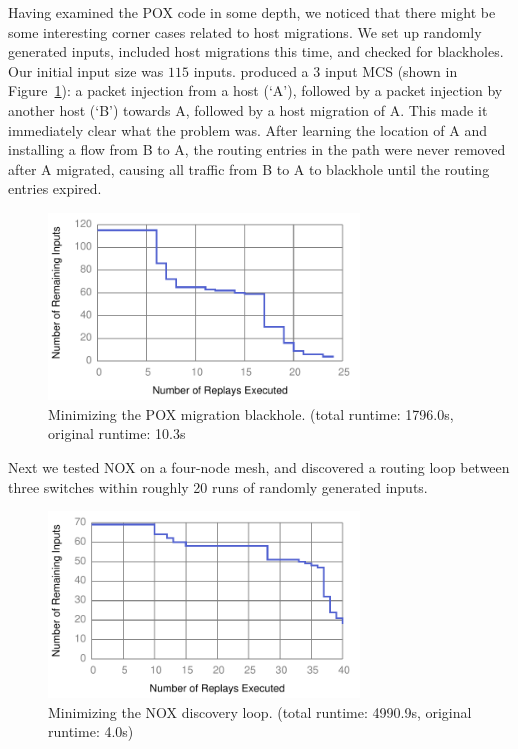 Having
examined the POX code in some depth, we noticed that there might be
some interesting corner cases related to host migrations.
We set up randomly generated inputs, included host
migrations this time, and checked for blackholes. Our initial input size was
$115$ inputs.
\projectname produced a $3$ input MCS (shown
in Figure~\ref{fig:pox_migration}): a packet injection from a
host (`A'), followed
by a packet injection by another host (`B') towards A, followed by a host migration of A. This made it immediately
clear what the problem was. After learning the location of A and installing a
flow from B to A, the routing entries in the path were never removed after A
migrated, causing all traffic from B to A to blackhole until the routing
entries expired.\\[0.5ex]
\begin{figure}[t]
    \includegraphics[width=3.25in]{../graphs/runtime/pox_migration_blackhole.pdf}
    \caption[]{\label{fig:pox_migration} Minimizing the POX migration
    blackhole. (total runtime: 1796.0s, original runtime: 10.3s}
\end{figure}
 Next we tested NOX on a four-node mesh, and discovered a
routing loop between three switches within
roughly 20 runs of randomly generated inputs.

\begin{figure}[t]
    \includegraphics[width=3.25in]{../graphs/runtime/nox_loop.pdf}
    \caption[]{\label{fig:nox_discovery} Minimizing the NOX discovery loop.
    (total runtime: 4990.9s, original runtime: 4.0s)}
\end{figure}

